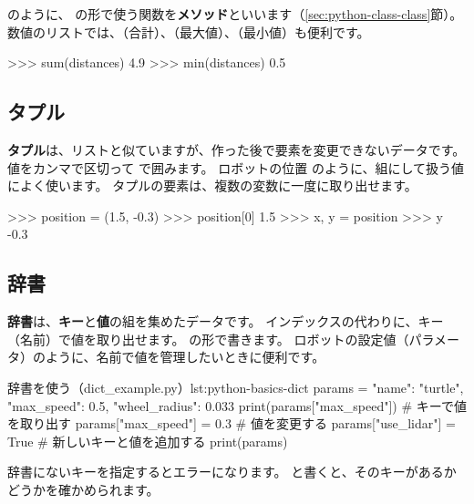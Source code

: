  のように、 の形で使う関数を\textbf{メソッド}といいます（\ref{sec:python-class-class}節）。
数値のリストでは、（合計）、（最大値）、（最小値）も便利です。

\begin{terminal}
>>> sum(distances)
4.9
>>> min(distances)
0.5
\end{terminal}

\subsection{タプル}

\textbf{タプル}は、リストと似ていますが、作った後で要素を変更できないデータです。
値をカンマで区切って \cmd{( )} で囲みます。
ロボットの位置  のように、組にして扱う値によく使います。
タプルの要素は、複数の変数に一度に取り出せます。

\begin{terminal}[タプルを使う]
>>> position = (1.5, -0.3)
>>> position[0]
1.5
>>> x, y = position
>>> y
-0.3
\end{terminal}

\subsection{辞書}

\textbf{辞書}は、\textbf{キー}と\textbf{値}の組を集めたデータです。
インデックスの代わりに、キー（名前）で値を取り出せます。
 の形で書きます。
ロボットの設定値（パラメータ）のように、名前で値を管理したいときに便利です。

\begin{codelisting}[style=python]{辞書を使う（dict\_example.py）}{lst:python-basics-dict}
params = {"name": "turtle", "max_speed": 0.5, "wheel_radius": 0.033}
print(params["max_speed"])     # キーで値を取り出す
params["max_speed"] = 0.3      # 値を変更する
params["use_lidar"] = True     # 新しいキーと値を追加する
print(params)
\end{codelisting}


辞書にないキーを指定するとエラーになります。
 と書くと、そのキーがあるかどうかを確かめられます。

